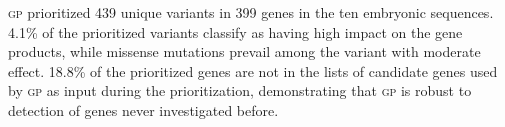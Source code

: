 \documentclass[fleqn,12pt]{wlscirep}
\newcommand{\gp}[]{\textsc{gp }}
\begin{document}
\gp prioritized 439 unique variants in 399 genes in the ten embryonic sequences. %
4.1\% of the prioritized variants %
classify as having high impact on the gene products, while missense mutations prevail among the variant with moderate effect. 18.8\% of the prioritized genes are not in the lists of candidate genes used by \gp as input during the prioritization, demonstrating that \gp is robust to detection of genes never investigated before.%
\end{document}
